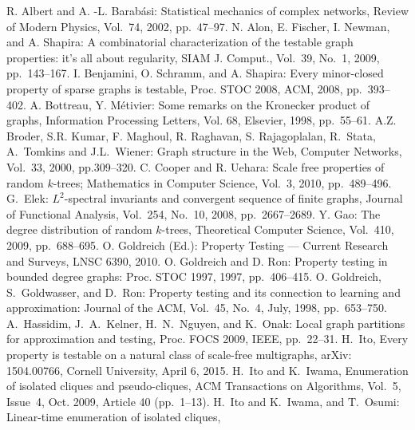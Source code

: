\documentclass[11pt]{article}
\begin{document}
\begin{thebibliography}{99}
R. Albert and A. -L. Barab\'asi: 
Statistical mechanics of complex networks, 
Review of Modern Physics, Vol.~74, 2002, pp.~47--97.
N. Alon, E. Fischer, I. Newman, and A. Shapira:
A combinatorial characterization of the testable graph properties: it's all about regularity, 
SIAM J. Comput., Vol.~39, No.~1, 2009, pp.~143--167. 
I. Benjamini, O. Schramm, and A. Shapira: 
Every minor-closed property of sparse
graphs is testable, Proc. STOC 2008, ACM, 2008, pp.~393--402. 
A. Bottreau, Y. M\'etivier: 
Some remarks on the Kronecker product of graphs, 
Information Processing Letters, Vol. 68, Elsevier, 1998, pp.~55--61. 
A.Z. Broder, S.R. Kumar, F. Maghoul, R. Raghavan, S. Rajagoplalan, 
R.~Stata, A.~Tomkins and J.L.~Wiener: 
Graph structure in the Web, 
Computer Networks, Vol.~33, 2000, pp.309--320. 
C. Cooper and R. Uehara: 
Scale free properties of random $k$-trees; 
Mathematics in Computer Science, Vol.~3, 2010, pp.~489--496. 
G.~Elek: 
$L^2$-spectral invariants and convergent sequence of finite graphs, 
Journal of Functional Analysis, Vol.~254, No.~10, 2008, pp.~2667--2689.
Y. Gao: 
The degree distribution of random $k$-trees, 
Theoretical Computer Science, Vol.~410, 2009, pp.~688--695. 
O. Goldreich (Ed.): 
Property Testing --- Current Research and Surveys, 
LNSC 6390, 2010. 
O. Goldreich and D. Ron: 
Property testing in bounded
degree graphs: Proc. STOC 1997, 1997, pp.~406--415.
O. Goldreich, S.~Goldwasser, and D.~Ron: 
Property testing and its connection to learning and approximation: 
Journal of the ACM, Vol.~45, No.~4, July, 1998, pp.~653--750. 
A.~Hassidim, J.~A.~Kelner, H.~N.~Nguyen, and K.~Onak:
Local graph partitions for approximation and testing, 
Proc. FOCS 2009, IEEE,  pp.~22--31.
H.~Ito, 
Every property is testable on a natural class of scale-free multigraphs, 
arXiv: 1504.00766, Cornell University, April 6, 2015.
H.~Ito and K.~Iwama, 
Enumeration of isolated cliques and pseudo-cliques, 
ACM Transactions on Algorithms, Vol.~5, Issue~4, 
Oct. 2009, Article 40 (pp.~1--13). 
H.~Ito and K.~Iwama, and T.~Osumi: 
Linear-time enumeration of isolated cliques, 

\end{thebibliography}
\end{document}

